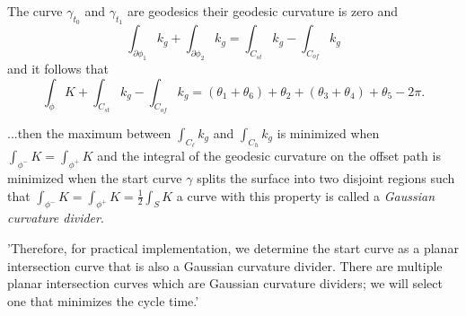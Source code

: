 The curve $\gamma_{t_0}$ and $\gamma_{t_1}$ are geodesics
their geodesic curvature is zero and
\begin{equation}\label{eqn:phi-sum}
\int_{\partial\phi_1}k_g+\int_{\partial\phi_2}k_g=\int_{C_{st}}k_g -\int_{C_{of}}k_g
\end{equation}
and it follows that 
\begin{equation}\label{eqn:phi-sum}
\int_{\phi}K+\int_{C_{st}}k_g -\int_{C_{of}}k_g=(\theta_1+\theta_6)+\theta_2 +(\theta_3+\theta_4)+\theta_5-2\pi.
\end{equation}

...then the maximum between $\int_{C_\ell} k_g$ and $\int_{C_h} k_g$ is minimized when
$\int_{\phi^-}K=\int_{\phi^+}K$ and the integral of the geodesic curvature on the offset path
is minimized when the start curve $\gamma$ splits the surface into two disjoint regions
such that $\int_{\phi^-}K=\int_{\phi^+}K=\frac{1}{2}\int_S K$ a curve with this property
is called a \emph{Gaussian curvature divider}.

'Therefore, for practical implementation, we determine the start curve as a planar intersection curve that
is also a Gaussian curvature divider. There are multiple
planar intersection curves which are Gaussian curvature
dividers; we will select one that minimizes the cycle time.'